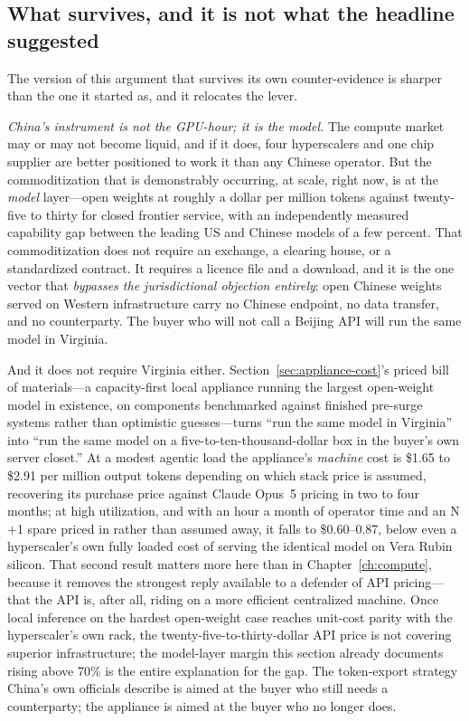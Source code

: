 \subsection{What survives, and it is not what the headline suggested}

The version of this argument that survives its own counter-evidence is sharper than the one it started as, and it relocates the lever.

\emph{China's instrument is not the GPU-hour; it is the model.} The compute market may or may not become liquid, and if it does, four hyperscalers and one chip supplier are better positioned to work it than any Chinese operator. But the commoditization that is demonstrably occurring, at scale, right now, is at the \emph{model} layer---open weights at roughly a dollar per million tokens against twenty-five to thirty for closed frontier service, with an independently measured capability gap between the leading US and Chinese models of a few percent. That commoditization does not require an exchange, a clearing house, or a standardized contract. It requires a licence file and a download, and it is the one vector that \emph{bypasses the jurisdictional objection entirely}: open Chinese weights served on Western infrastructure carry no Chinese endpoint, no data transfer, and no counterparty. The buyer who will not call a Beijing API will run the same model in Virginia.

And it does not require Virginia either. Section~\ref{sec:appliance-cost}'s priced bill of materials---a capacity-first local appliance running the largest open-weight model in existence, on components benchmarked against finished pre-surge systems rather than optimistic guesses---turns ``run the same model in Virginia'' into ``run the same model on a five-to-ten-thousand-dollar box in the buyer's own server closet.'' At a modest agentic load the appliance's \emph{machine} cost is \$1.65 to \$2.91 per million output tokens depending on which stack price is assumed, recovering its purchase price against Claude Opus~5 pricing in two to four months; at high utilization, and with an hour a month of operator time and an N$+$1 spare priced in rather than assumed away, it falls to \$0.60--0.87, below even a hyperscaler's own fully loaded cost of serving the identical model on Vera Rubin silicon. That second result matters more here than in Chapter~\ref{ch:compute}, because it removes the strongest reply available to a defender of API pricing---that the API is, after all, riding on a more efficient centralized machine. Once local inference on the hardest open-weight case reaches unit-cost parity with the hyperscaler's own rack, the twenty-five-to-thirty-dollar API price is not covering superior infrastructure; the model-layer margin this section already documents rising above 70\% is the entire explanation for the gap. The token-export strategy China's own officials describe is aimed at the buyer who still needs a counterparty; the appliance is aimed at the buyer who no longer does.

